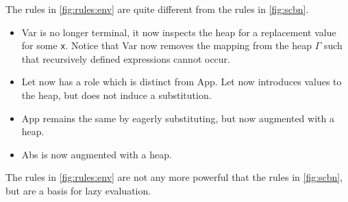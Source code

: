 The rules in \autoref{fig:rules:env} are quite different from the rules in \autoref{fig:scbn}.
\begin{itemize}
	\item Var is no longer terminal, it now inspects the heap for a replacement value for some \texttt{x}.
	      Notice that Var now removes the mapping from the heap $\Gamma$ such that recursively defined expressions cannot occur.
	\item Let now has a role which is distinct from App.
	      Let now introduces values to the heap, but does not induce a substitution.
	\item App remains the same by eagerly substituting, but now augmented with a heap.
	\item Abs is now augmented with a heap.
\end{itemize}
The rules in \autoref{fig:rules:env} are not any more powerful that the rules in \autoref{fig:scbn}, but are a basis for lazy evaluation.

